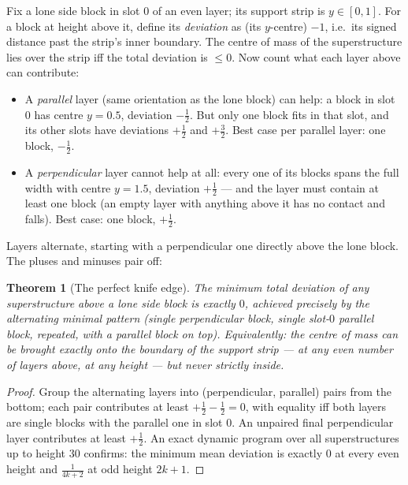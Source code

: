 \documentclass[11pt]{article}
\newtheorem{theorem}{Theorem}
\theoremstyle{definition}
\theoremstyle{remark}
\begin{document}
Fix a lone side block in slot $0$ of an even layer; its support strip is
$y \in [0,1]$. For a block at height above it, define its \emph{deviation}
as (its $y$-centre) $- 1$, i.e.\ its signed distance past the strip's inner
boundary. The centre of mass of the superstructure lies over the strip iff
the total deviation is $\le 0$. Now count what each layer above can
contribute:

\begin{itemize}
\item A \emph{parallel} layer (same orientation as the lone block) can help:
a block in slot $0$ has centre $y = 0.5$, deviation $-\tfrac12$. But only
one block fits in that slot, and its other slots have deviations
$+\tfrac12$ and $+\tfrac32$. Best case per parallel layer: one block,
$-\tfrac12$.
\item A \emph{perpendicular} layer cannot help at all: every one of its
blocks spans the full width with centre $y = 1.5$, deviation $+\tfrac12$
--- and the layer must contain at least one block (an empty layer with
anything above it has no contact and falls). Best case: one block,
$+\tfrac12$.
\end{itemize}

Layers alternate, starting with a perpendicular one directly above the lone
block. The pluses and minuses pair off:

\begin{theorem}[The perfect knife edge]\label{thm:knife}
The minimum total deviation of any superstructure above a lone side block
is exactly $0$, achieved precisely by the alternating minimal pattern
(single perpendicular block, single slot-$0$ parallel block, repeated, with
a parallel block on top). Equivalently: the centre of mass can be brought
exactly \emph{onto} the boundary of the support strip --- at any even
number of layers above, at any height --- but never strictly inside.
\end{theorem}

\begin{proof}
Group the alternating layers into (perpendicular, parallel) pairs from the
bottom; each pair contributes at least $+\tfrac12 - \tfrac12 = 0$, with
equality iff both layers are single blocks with the parallel one in slot
$0$. An unpaired final perpendicular layer contributes at least
$+\tfrac12$. An exact dynamic program over all superstructures up to height
$30$ confirms: the minimum mean deviation is exactly $0$ at every even
height and $\tfrac{1}{4k+2}$ at odd height $2k+1$.
\end{proof}
\end{document}
